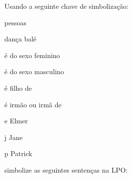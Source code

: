 \solutions
\problempart
\label{pr.FOLballet}
Usando a seguinte chave de simbolização:
\begin{ekey}
\item[\text{domínio}] pessoas
\item[\atom{D}{x}]  dança balé
\item[\atom{F}{x}]  é do sexo feminino
\item[\atom{M}{x}]  é do sexo masculino
\item[\atom{C}{x,y}]  é filho de 
\item[\atom{S}{x,y}]  é irmão ou irmã de 
\item[e] Elmer
\item[j] Jane
\item[p] Patrick
\end{ekey}
simbolize as seguintes sentenças na LPO:
